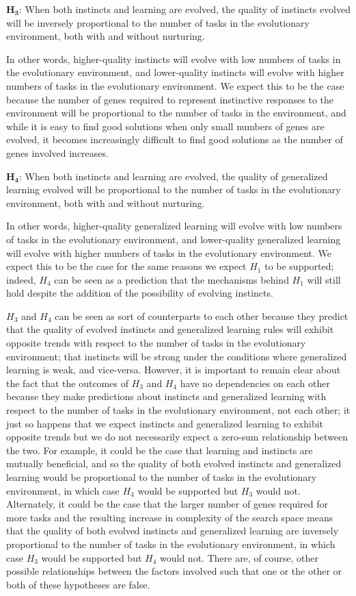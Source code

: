 \documentclass[master]{outhesis}
\begin{document}
$\mathbf{H_3}$: When both instincts and learning are evolved, the quality of instincts evolved will be inversely proportional to the number of tasks in the evolutionary environment, both with and without nurturing.

In other words, higher-quality instincts will evolve with low numbers of tasks in the evolutionary environment,
and lower-quality instincts will evolve with higher numbers of tasks in the evolutionary environment.
We expect this to be the case because the number of genes required to represent instinctive responses to the environment will be proportional to the number of tasks in the environment,
and while it is easy to find good solutions when only small numbers of genes are evolved,
it becomes increasingly difficult to find good solutions as the number of genes involved increases.

$\mathbf{H_4}$: When both instincts and learning are evolved, the quality of generalized learning evolved will be proportional to the number of tasks in the evolutionary environment, both with and without nurturing.

In other words, higher-quality generalized learning will evolve with low numbers of tasks in the evolutionary environment,
and lower-quality generalized learning will evolve with higher numbers of tasks in the evolutionary environment.
We expect this to be the case for the same reasons we expect $H_1$ to be supported;
indeed, $H_4$ can be seen as a prediction that the mechanisms behind $H_1$ will still hold despite the addition of the possibility of evolving instincts.

$H_3$ and $H_4$ can be seen as sort of counterparts to each other 
because they predict that the quality of evolved instincts and generalized learning rules will exhibit opposite trends with respect to the number of tasks in the evolutionary environment; 
that instincts will be strong under the conditions where generalized learning is weak, and vice-versa.
However, it is important to remain clear about the fact that the outcomes of $H_3$ and $H_4$ have no dependencies on each other because they make predictions about instincts and generalized learning with respect to the number of tasks in the evolutionary environment, not each other;
it just so happens that we expect instincts and generalized learning to exhibit opposite trends
but we do not necessarily expect a zero-sum relationship between the two.
For example, it could be the case that learning and instincts are mutually beneficial,
and so the quality of both evolved instincts and generalized learning would be proportional to the number of tasks in the evolutionary environment,
in which case $H_4$ would be supported but $H_3$ would not.
Alternately, it could be the case that
the larger number of genes required for more tasks and the resulting increase in complexity of the search space means that
the quality of both evolved instincts and generalized learning are inversely proportional to the number of tasks in the evolutionary environment,
in which case $H_3$ would be supported but $H_4$ would not.
There are, of course, other possible relationships between the factors involved such that one or the other or both of these hypotheses are false.
\end{document}
